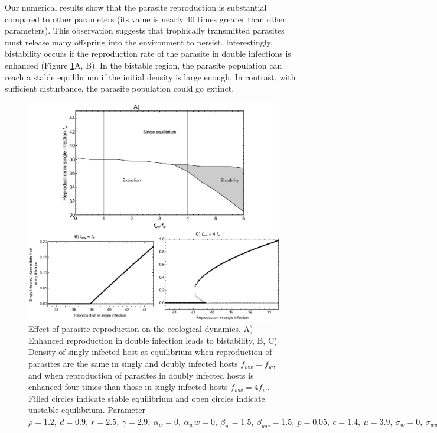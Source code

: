 \documentclass[a4paper]{scrartcl}
\begin{document}
Our numerical results show that the parasite reproduction is substantial compared to other parameters (its value is nearly 40 times greater than other parameters).
This observation suggests that trophically transmitted parasites must release many offspring into the environment to persist. 
Interestingly, bistability occurs if the reproduction rate of the parasite in double infections is enhanced (Figure \ref{fig:bistability}A, B). 
In the bistable region, the parasite population can reach a stable equilibrium if the initial density is large enough. 
In contrast, with sufficient disturbance, the parasite population could go extinct.

\begin{figure}[!ht]
\includegraphics[width = \textwidth]{Figures/reproduction_bifurcation.pdf}
\caption{Effect of parasite reproduction on the ecological dynamics. A) Enhanced reproduction in double infection leads to bistability, B, C) Density of singly infected host at equilibrium when reproduction of parasites are the same in singly and doubly infected hosts $f_{ww} = f_w$, and when reproduction of parasites in doubly infected hosts is enhanced four times than those in singly infected hosts $f_{ww} = 4 f_w$. Filled circles indicate stable equilibrium and open circles indicate unstable equilibrium. Parameter $\rho = 1.2, \  d = 0.9, \  r = 2.5, \ \gamma = 2.9, \ \alpha_w = 0, \ \alpha_ww =  0, \ \beta_w = 1.5, \ \beta_{ww} = 1.5, \ p = 0.05, \  c = 1.4, \ \mu = 3.9,  \ \sigma_w = 0, \ \sigma_{ww} = 0, \  q = 0.05, \ \delta = 0.9, \ k = 0.26, \ h_1 = h_2 = 0.6$
}
\label{fig:bistability}
\end{figure}
\end{document}
